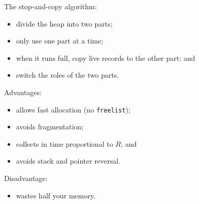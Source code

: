 \begin{slide*}
The stop-and-copy algorithm:

\begin{itemize}
\item divide the heap into two parts;
\item only use one part at a time;
\item when it runs full, copy live records to the other part; and
\item switch the roles of the two parts.
\end{itemize}

Advantages:

\begin{itemize}
\item allows fast allocation (no {\tt freelist});
\item avoids fragmentation; 
\item collects in time proportional to $R$; and
\item avoids stack and pointer reversal.
\end{itemize}

Disadvantage:

\begin{itemize}
\item wastes half your memory.
\end{itemize}
\vfil
\end{slide*}


